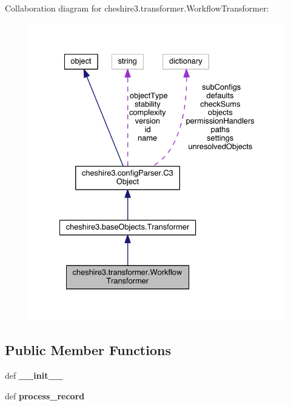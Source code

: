 Collaboration diagram for cheshire3.\-transformer.\-Workflow\-Transformer\-:
\nopagebreak
\begin{figure}[H]
\begin{center}
\leavevmode
\includegraphics[width=331pt]{classcheshire3_1_1transformer_1_1_workflow_transformer__coll__graph}
\end{center}
\end{figure}
\subsection*{Public Member Functions}
\begin{DoxyCompactItemize}
\item 
\hypertarget{classcheshire3_1_1transformer_1_1_workflow_transformer_a5bdadbd7e26bf7df476c31b48b4c229b}{def {\bfseries \-\_\-\-\_\-init\-\_\-\-\_\-}}\label{classcheshire3_1_1transformer_1_1_workflow_transformer_a5bdadbd7e26bf7df476c31b48b4c229b}

\item 
\hypertarget{classcheshire3_1_1transformer_1_1_workflow_transformer_a671aae637623b240c331b0db3fcc076f}{def {\bfseries process\-\_\-record}}\label{classcheshire3_1_1transformer_1_1_workflow_transformer_a671aae637623b240c331b0db3fcc076f}

\end{DoxyCompactItemize}
